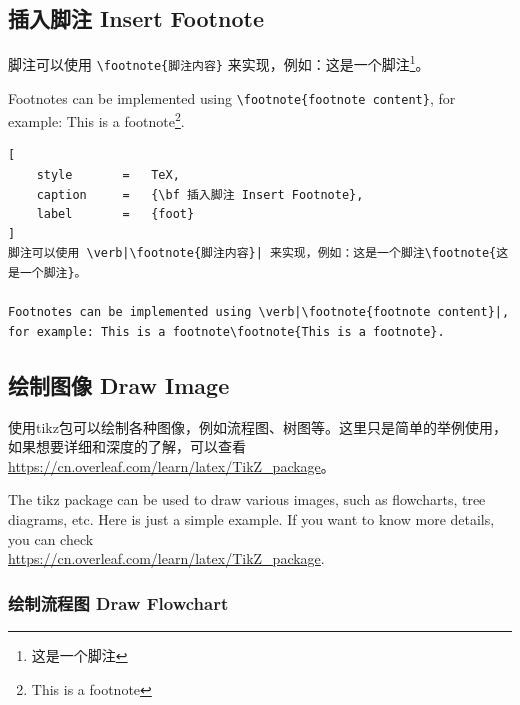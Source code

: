 \documentclass{article}
\begin{document}
\subsection{插入脚注 Insert Footnote}

脚注可以使用 \verb|\footnote{脚注内容}| 来实现，例如：这是一个脚注\footnote{这是一个脚注}。

Footnotes can be implemented using \verb|\footnote{footnote content}|, for example: This is a footnote\footnote{This is a footnote}.

\clearpage

\begin{lstlisting}[
    style       =   TeX,
    caption     =   {\bf 插入脚注 Insert Footnote},
    label       =   {foot}
]
脚注可以使用 \verb|\footnote{脚注内容}| 来实现，例如：这是一个脚注\footnote{这是一个脚注}。

Footnotes can be implemented using \verb|\footnote{footnote content}|, for example: This is a footnote\footnote{This is a footnote}.
\end{lstlisting}

\subsection{绘制图像 Draw Image}

使用tikz包可以绘制各种图像，例如流程图、树图等。这里只是简单的举例使用，如果想要详细和深度的了解，可以查看 \href{https://cn.overleaf.com/learn/latex/TikZ_package}{https://cn.overleaf.com/learn/latex/TikZ\_package}。

The tikz package can be used to draw various images, such as flowcharts, tree diagrams, etc. Here is just a simple example. If you want to know more details, you can check\\ \href{https://cn.overleaf.com/learn/latex/TikZ_package}{https://cn.overleaf.com/learn/latex/TikZ\_package}.

\subsubsection{绘制流程图 Draw Flowchart}
\end{document}
